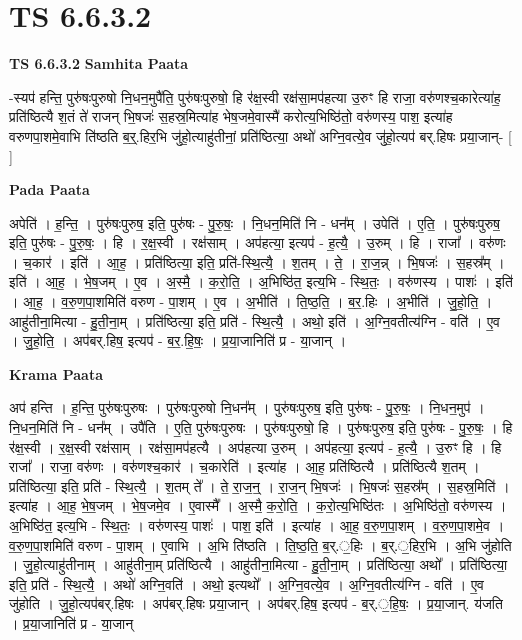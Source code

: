 \documentclass[17pt]{extarticle}
\begin{document}
\section{ TS 6.6.3.2 }

\textbf{TS 6.6.3.2 } \newline
\textbf{Samhita Paata} \newline

-स्यप॑ हन्ति॒ पुरु॑षःपुरुषो नि॒धन॒मुपै॑ति॒ पुरु॑षःपुरुषो॒ हि र॑क्ष॒स्वी रक्ष॑सा॒मप॑हत्या उ॒रुꣳ हि राजा॒ वरु॑णश्च॒कारेत्या॑ह॒ प्रति॑ष्ठित्यै श॒तं ते॑ राजन् भि॒षजः॑ स॒हस्र॒मित्या॑ह भेष॒जमे॒वास्मै॑ करोत्य॒भिष्ठि॑तो॒ वरु॑णस्य॒ पाश॒ इत्या॑ह वरुणपा॒शमे॒वाभि ति॑ष्ठति ब॒र्॒.हिर॒भि जु॑हो॒त्याहु॑तीनां॒ प्रति॑ष्ठित्या॒ अथो॑ अग्नि॒वत्ये॒व जु॑हो॒त्यप॑ बर्.हिषः प्रया॒जान्- [  ] \newline

\textbf{Pada Paata} \newline

अपेति॑ । ह॒न्ति॒ । पुरु॑षःपुरुष॒ इति॒ पुरु॑षः - पु॒रु॒षः॒ । नि॒धन॒मिति॑ नि - धन᳚म् । उपेति॑ । ए॒ति॒ । पुरु॑षःपुरुष॒ इति॒ पुरु॑षः - पु॒रु॒षः॒ । हि । र॒क्ष॒स्वी । रक्ष॑साम् । अप॑हत्या॒ इत्यप॑ - ह॒त्यै॒ । उ॒रुम् । हि । राजा᳚ । वरु॑णः । च॒कार॑ । इति॑ । आ॒ह॒ । प्रति॑ष्ठित्या॒ इति॒ प्रति॑-स्थि॒त्यै॒ । श॒तम् । ते॒ । रा॒ज॒न्न् । भि॒षजः॑ । स॒हस्र᳚म् । इति॑ । आ॒ह॒ । भे॒ष॒जम् । ए॒व । अ॒स्मै॒ । क॒रो॒ति॒ । अ॒भिष्ठि॑त॒ इत्य॒भि - स्थि॒तः॒ । वरु॑णस्य । पाशः॑ । इति॑ । आ॒ह॒ । व॒रु॒ण॒पा॒शमिति॑ वरुण - पा॒शम् । ए॒व । अ॒भीति॑ । ति॒ष्ठ॒ति॒ । ब॒र॒.हिः । अ॒भीति॑ । जु॒हो॒ति॒ । आहु॑तीना॒मित्या - हु॒ती॒ना॒म् । प्रति॑ष्ठित्या॒ इति॒ प्रति॑ - स्थि॒त्यै॒ । अथो॒ इति॑ । अ॒ग्नि॒वतीत्य॑ग्नि - वति॑ । ए॒व । जु॒हो॒ति॒ । अप॑बर्.हिष॒ इत्यप॑ - ब॒र॒.हि॒षः॒ । प्र॒या॒जानिति॑ प्र - या॒जान् ।  \newline


\textbf{Krama Paata} \newline

अप॑ हन्ति । ह॒न्ति॒ पुरु॑षःपुरुषः । पुरु॑षःपुरुषो नि॒धन᳚म् । पुरु॑षःपुरुष॒ इति॒ पुरु॑षः - पु॒रु॒षः॒ । नि॒धन॒मुप॑ । नि॒धन॒मिति॑ नि - धन᳚म् । उपै॑ति । ए॒ति॒ पुरु॑षःपुरुषः । पुरु॑षःपुरुषो॒ हि । पुरु॑षःपुरुष॒ इति॒ पुरु॑षः - पु॒रु॒षः॒ । हि र॑क्ष॒स्वी । र॒क्ष॒स्वी रक्ष॑साम् । रक्ष॑सा॒मप॑हत्यै । अप॑हत्या उ॒रुम् । अप॑हत्या॒ इत्यप॑ - ह॒त्यै॒ । उ॒रुꣳ हि । हि राजा᳚ । राजा॒ वरु॑णः । वरु॑णश्च॒कार॑ । च॒कारेति॑ । इत्या॑ह । आ॒ह॒ प्रति॑ष्ठित्यै । प्रति॑ष्ठित्यै श॒तम् । प्रति॑ष्ठित्या॒ इति॒ प्रति॑ - स्थि॒त्यै॒ । श॒तम् ते᳚ । ते॒ रा॒ज॒न्॒ । रा॒ज॒न् भि॒षजः॑ । भि॒षजः॑ स॒हस्र᳚म् । स॒हस्र॒मिति॑ । इत्या॑ह । आ॒ह॒ भे॒ष॒जम् । भे॒ष॒जमे॒व । ए॒वास्मै᳚ । अ॒स्मै॒ क॒रो॒ति॒ । क॒रो॒त्य॒भिष्ठि॑तः । अ॒भिष्ठि॑तो॒ वरु॑णस्य । अ॒भिष्ठि॑त॒ इत्य॒भि - स्थि॒तः॒ । वरु॑णस्य॒ पाशः॑ । पाश॒ इति॑ । इत्या॑ह । आ॒ह॒ व॒रु॒ण॒पा॒शम् । व॒रु॒ण॒पा॒शमे॒व । व॒रु॒ण॒पा॒शमिति॑ वरुण - पा॒शम् । ए॒वाभि । अ॒भि ति॑ष्ठति । ति॒ष्ठ॒ति॒ ब॒र्.॒हिः । ब॒र्.॒हिर॒भि । अ॒भि जु॑होति । जु॒हो॒त्याहु॑तीनाम् । आहु॑तीना॒म् प्रति॑ष्ठित्यै । आहु॑तीना॒मित्या - हु॒ती॒ना॒म् । प्रति॑ष्ठित्या॒ अथो᳚ । प्रति॑ष्ठित्या॒ इति॒ प्रति॑ - स्थि॒त्यै॒ । अथो॑ अग्नि॒वति॑ । अथो॒ इत्यथो᳚ । अ॒ग्नि॒वत्ये॒व । अ॒ग्नि॒वतीत्य॑ग्नि - वति॑ । ए॒व जु॑होति । जु॒हो॒त्यप॑बर्.हिषः । अप॑बर्.हिषः प्रया॒जान् । अप॑बर्.हिष॒ इत्यप॑ - ब॒र्.॒हि॒षः॒ । प्र॒या॒जान्. य॑जति । प्र॒या॒जानिति॑ प्र - या॒जान् \newline
\end{document}
